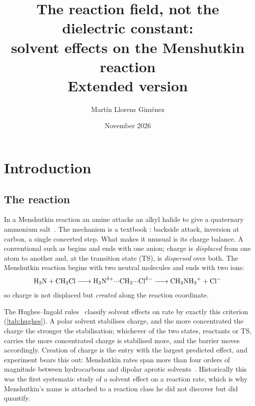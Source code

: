 \documentclass[10pt,a4paper]{article}
\title{The reaction field, not the dielectric constant:\\
solvent effects on the Menshutkin reaction \ce{H3N + CH3Cl}\\
\large\normalfont Extended version}
\author{Martín Llorens Giménez}
\date{November 2026}
\begin{document}
\maketitle

\begin{center}
\end{center}

\section{Introduction}

\subsection{The reaction}

In a Menshutkin reaction an amine attacks an alkyl halide to give a quaternary
ammonium salt~\cite{Menschutkin1890}. The mechanism is a textbook :
backside attack, inversion at carbon, a single concerted step. What makes it
unusual is its charge balance. A conventional  such as
 begins and ends with one anion; charge is
\emph{displaced} from one atom to another and, at the transition state (TS), is
\emph{dispersed} over both. The Menshutkin reaction begins with two neutral
molecules and ends with two ions:
%
\begin{equation}
  \ce{H3N + CH3Cl -> H3N^{\delta+}\bond{...}CH3\bond{...}Cl^{\delta-}
      -> CH3NH3+ + Cl-}
\end{equation}
%
so charge is not displaced but \emph{created} along the reaction coordinate.

The Hughes--Ingold rules~\cite{Hughes1935} classify solvent effects on rate by
exactly this criterion (\cref{tab:hughes}). A polar solvent stabilises charge, and
the more concentrated the charge the stronger the stabilisation; whichever of the
two states, reactants or TS, carries the more concentrated charge is stabilised
more, and the barrier moves accordingly. Creation of charge is the entry with the
largest predicted effect, and experiment bears this out: Menshutkin rates span more
than four orders of magnitude between hydrocarbons and dipolar aprotic
solvents~\cite{Reichardt2011}. Historically this was the first systematic study of
a solvent effect on a reaction rate, which is why Menshutkin's name is attached to
a reaction class he did not discover but did quantify.
\end{document}
